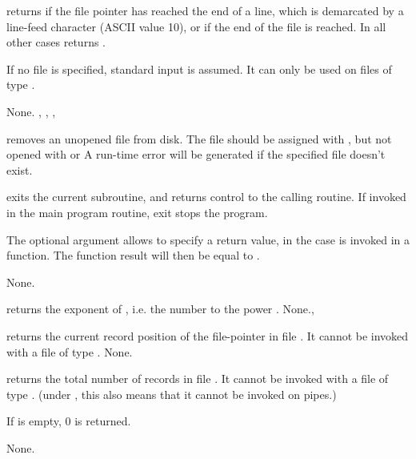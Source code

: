 \documentclass{report}
\begin{document}
\html{}

{ returns  if the file pointer has reached the end of a
line, which is demarcated by a line-feed character (ASCII value 10), or if
the end of the file is reached.
In all other cases  returns .

If no file  is specified, standard input is assumed.
It can only be used on files of type .}
{None.}
{, , , }

\html{}

{ removes an unopened file from disk. The file should be
assigned with , but not opened with  or }
{A run-time error will be generated if the specified file doesn't exist.}
{}

\html{}

{ exits the current subroutine, and returns control to the calling
routine. If invoked in the main program routine, exit stops the program.

The optional argument  allows to specify a return value, in the case
 is invoked in a function. The function result will then be
equal to .}
{None.}
{}

\html{}

{ returns the exponent of , i.e. the number  to the
power .}
{None.}{, }

\html{}

{ returns the current record position of the file-pointer in file
. It cannot be invoked with a file of type .}
{None.}
{}

\html{}

{ returns the total number of records in file . 
It cannot be invoked with a file of type . (under \linux, this
also means that it cannot be invoked on pipes.)

If  is empty, 0 is returned.
}
{None.}
{}
\end{document}
